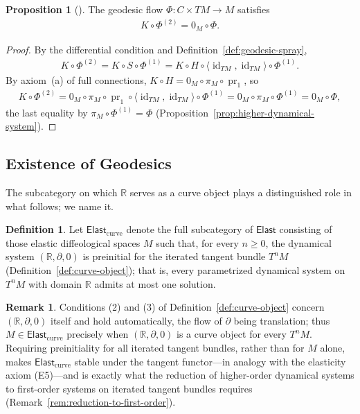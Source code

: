 \documentclass{amsart}
\newcommand{\R}{\mathbb{R}}
\DeclareMathOperator{\pr}{pr}
\DeclareMathOperator{\id}{id}
\theoremstyle{definition}
\newtheorem{defn}[thm]{Definition}
\newtheorem{rem}[thm]{Remark}
\newtheorem{prop}[thm]{Proposition}
\begin{document}
\begin{prop}[{\cite[Section~3.5]{CCL}}]\label{prop:acceleration-zero}
  The geodesic flow $\Phi \colon C \times TM \to M$ satisfies
  \begin{align*}
      K \circ \Phi^{(2)} = 0_{M} \circ \Phi.
  \end{align*}
\end{prop}

\begin{proof}
  By the differential condition and Definition~\ref{def:geodesic-spray},
  \begin{align*}
      K \circ \Phi^{(2)}
        = K \circ S \circ \Phi^{(1)}
        = K \circ H \circ \langle \id_{TM}, \id_{TM} \rangle \circ \Phi^{(1)}.
  \end{align*}
  By axiom~(a) of full connections,
  $K \circ H = 0_M \circ \pi_M \circ \pr_1$, so
  \begin{align*}
      K \circ \Phi^{(2)}
        = 0_M \circ \pi_M \circ \pr_1
          \circ \langle \id_{TM}, \id_{TM} \rangle \circ \Phi^{(1)}
        = 0_M \circ \pi_M \circ \Phi^{(1)}
        = 0_M \circ \Phi,
  \end{align*}
  the last equality by $\pi_M \circ \Phi^{(1)} = \Phi$
  (Proposition~\ref{prop:higher-dynamical-system}).
\end{proof}

\subsection{Existence of Geodesics}\label{subsec:geodesic-existence}

The subcategory on which $\R$ serves as a curve object plays a distinguished
role in what follows; we name it.

\begin{defn}\label{def:elast-lc}
  Let $\mathsf{Elast}_{\mathrm{curve}}$ denote the full subcategory of $\mathsf{Elast}$ consisting of those elastic diffeological spaces $M$ such that, for every $n \geq 0$, the dynamical system $(\R, \partial, 0)$
  is preinitial for the iterated tangent bundle $T^nM$ (Definition~\ref{def:curve-object}); that is, every parametrized dynamical system on $T^nM$ with domain $\R$ admits at most one solution.
\end{defn}

\begin{rem}\label{rem:elast-curve-closure}
  Conditions (2) and (3) of Definition~\ref{def:curve-object} concern $(\R, \partial, 0)$ itself and hold automatically, the flow of $\partial$ being translation; thus $M \in \mathsf{Elast}_{\mathrm{curve}}$ precisely when $(\R, \partial, 0)$ is a curve object for every $T^nM$. Requiring preinitiality for all iterated tangent bundles, rather than for $M$ alone, makes $\mathsf{Elast}_{\mathrm{curve}}$ stable under the tangent functor---in analogy with the elasticity axiom (E5)---and is exactly what the reduction of higher-order dynamical systems to first-order systems on iterated tangent bundles requires (Remark~\ref{rem:reduction-to-first-order}).
\end{rem}
\end{document}
